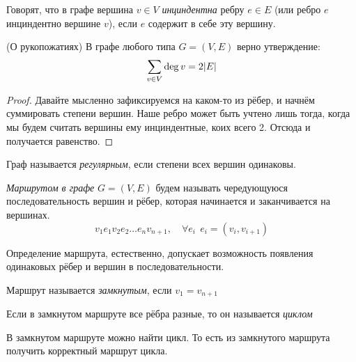 \begin{definition}
	Говорят, что в графе вершина $v \in V$ \textit{инциндентна} ребру $e \in E$ (или ребро $e$ инциндентно вершине $v$), если $e$ содержит в себе эту вершину.
\end{definition}

\begin{lemma} (О рукопожатиях)
	В графе любого типа $G = (V, E)$ верно утверждение:
	\[
		\sum\limits_{v \in V} \deg v = 2|E|
	\]
\end{lemma}

\begin{proof}
	Давайте мысленно зафиксируемся на каком-то из рёбер, и начнём суммировать степени вершин. Наше ребро может быть учтено лишь тогда, когда мы будем считать вершины ему инциндентные, коих всего 2. Отсюда и получается равенство.
\end{proof}

\begin{definition}
	Граф называется \textit{регулярным}, если степени всех вершин одинаковы.
\end{definition}

\begin{definition}
	\textit{Маршрутом в графе} $G = (V, E)$ будем называть чередующуюся последовательность вершин и рёбер, которая начинается и заканчивается на вершинах.
	\[
		v_1 e_1 v_2 e_2 \ldots e_n v_{n + 1}, \quad \forall e_i\ \ e_i = (v_i, v_{i + 1})
	\]
\end{definition}

\begin{note}
	Определение маршрута, естественно, допускает возможность появления одинаковых рёбер и вершин в последовательности.
\end{note}

\begin{definition}
	Маршрут называется \textit{замкнутым}, если $v_1 = v_{n + 1}$
\end{definition}

\begin{definition}
	Если в замкнутом маршруте все рёбра разные, то он называется \textit{циклом}
\end{definition}

\begin{lemma}
	В замкнутом маршруте можно найти цикл. То есть из замкнутого маршрута получить корректный маршрут цикла.
\end{lemma}

